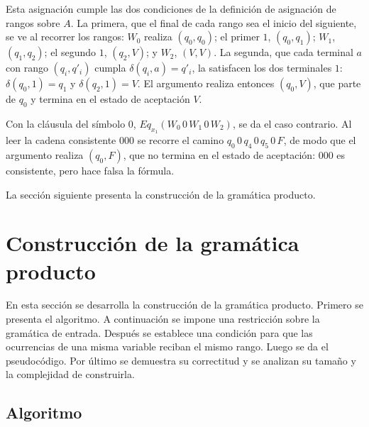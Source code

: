 \documentclass{report}
\theoremstyle{definition}
\theoremstyle{plain}
\begin{document}
\begin{center}
\end{center}

Esta asignación cumple las dos condiciones de la definición de
asignación de rangos sobre $A$. La primera, que el final de cada rango
sea el inicio del siguiente, se ve al recorrer los rangos: $W_0$ realiza
$(q_0, q_0)$; el primer $1$, $(q_0, q_1)$; $W_1$, $(q_1, q_2)$; el
segundo $1$, $(q_2, V)$; y $W_2$, $(V, V)$. La segunda, que cada terminal
$a$ con rango $(q_i, q'_i)$ cumpla $\delta(q_i, a) = q'_i$, la satisfacen
los dos terminales $1$: $\delta(q_0, 1) = q_1$ y $\delta(q_2, 1) = V$. El
argumento realiza entonces $(q_0, V)$, que parte de $q_0$ y termina en el
estado de aceptación $V$.

Con la cláusula del símbolo $0$, $Eq_{x_1}(W_0\,0\,W_1\,0\,W_2)$, se da
el caso contrario. Al leer la cadena consistente $000$ se recorre el
camino $q_0\,0\,q_4\,0\,q_5\,0\,F$, de modo que el argumento realiza
$(q_0, F)$, que no termina en el estado de aceptación: $000$ es
consistente, pero hace falsa la fórmula.

La sección siguiente presenta la construcción de la gramática producto.

\section{Construcción de la gramática producto}

En esta sección se desarrolla la construcción de la gramática
producto. Primero se presenta el algoritmo. A continuación se impone
una restricción sobre la gramática de entrada. Después se establece
una condición para que las ocurrencias de una misma variable reciban
el mismo rango. Luego se da el pseudocódigo. Por último se demuestra
su correctitud y se analizan su tamaño y la complejidad de construirla.

\subsection{Algoritmo}\label{subsec:algoritmo}
\end{document}
